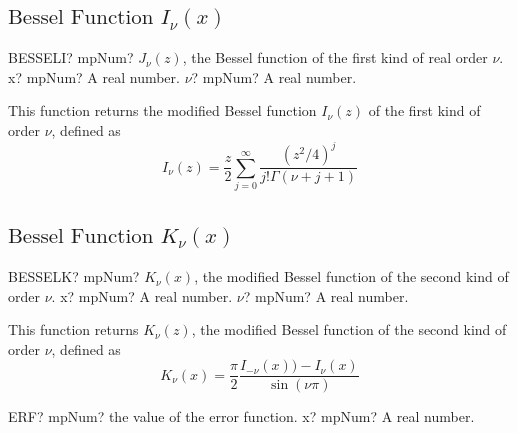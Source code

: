 \subsection{\texorpdfstring{$\text{Bessel Function }I_{\nu}(x)$}{Bessel Function Inu}}
\label{BESSELInu} 

\begin{mpFunctionsExtract}
	\mpWorksheetFunctionTwoNotImplemented
	{BESSELI? mpNum? $J_{\nu}(z)$, the Bessel function of the first kind of real order $\nu$.}
	{x? mpNum? A real number.}
	{$\nu$? mpNum? A real number.}
\end{mpFunctionsExtract}

\vspace{0.3cm}
This function returns the modified Bessel function $I_{\nu}(z)$ of the first kind of order $\nu$, defined as
\begin{equation}
	I_{\nu}(z)  = \frac{z}{2}  \sum_{j=0}^\infty \frac{(z^2 / 4)^j}{j! \Gamma(\nu+j+1)}
\end{equation}




\subsection{\texorpdfstring{$\text{Bessel Function }K_{\nu}(x)$}{Bessel Function Knu}}
\label{BESSELKnu} 

\begin{mpFunctionsExtract}
	\mpWorksheetFunctionTwoNotImplemented
	{BESSELK? mpNum?  $K_{\nu}(x)$, the modified Bessel function of the second kind of order $\nu$.}
	{x? mpNum? A real number.}
	{$\nu$? mpNum? A real number.}
\end{mpFunctionsExtract}

\vspace{0.3cm}
This function returns $K_{\nu}(z)$, the modified Bessel function of the second kind of order $\nu$, defined as
\begin{equation}
	K_{\nu}(x)  = \frac{\pi}{2} \frac{I_{-\nu}(x)) - I_{\nu}(x)}{ \sin(\nu \pi)}
\end{equation}




\vspace{0.6cm}
\begin{mpFunctionsExtract}
	\mpWorksheetFunctionOneNotImplemented
	{ERF? mpNum? the value of the error function.}
	{x? mpNum? A real number.}
\end{mpFunctionsExtract}


